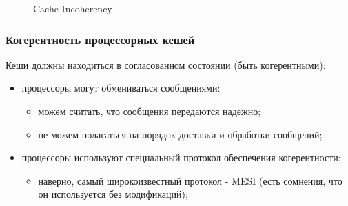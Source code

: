 \begin{frame}
\begin{figure}
  \caption{Cache Incoherency}
\end{figure}
\end{frame}

\begin{frame}
\frametitle{Когерентность процессорных кешей}

Кеши должны находиться в согласованном состоянии (быть когерентными):
\begin{itemize}
  \item процессоры могут обмениваться сообщениями:
        \begin{itemize}
          \item можем считать, что сообщения передаются надежно;
          \item не можем полагаться на порядок доставки и обработки сообщений;
        \end{itemize}
  \item процессоры используют специальный протокол обеспечения когерентности:
        \begin{itemize}
          \item наверно, самый широкоизвестный протокол - MESI (есть сомнения,
                что он используется без модификаций);
        \end{itemize}
\end{itemize}
\end{frame}

